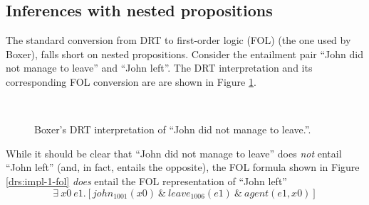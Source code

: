 \subsection*{Inferences with nested propositions}

The standard conversion from DRT to first-order logic (FOL) (the one used by
Boxer), falls short on nested propositions.  Consider the entailment pair ``John
did not manage to leave'' and ``John left''.  The DRT interpretation and its
corresponding FOL conversion are are shown in Figure \ref{drs:impl-1}.

\begin{figure}
  \centering
  ~~~~~~~~~
  \caption{Boxer's DRT interpretation of ``John did not manage to leave.''.}
  \label{drs:impl-1}
\end{figure}

While it should be clear that ``John did not manage to leave'' does {\it not}
entail ``John left'' (and, in fact, entails the opposite), the FOL formula shown
in Figure \ref{drs:impl-1-fol} {\it does} entail the FOL representation of
``John left'' \[ \exists~ x0~e1.[john_{1001}(x0) ~\&~ leave_{1006}(e1) ~\&~
agent(e1, x0)] \]  

